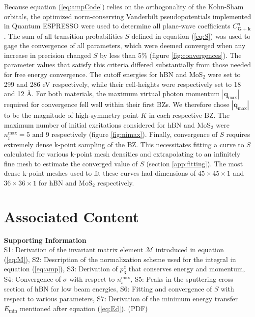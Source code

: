 \documentclass{article}
\begin{document}
Because equation (\ref{eq:ampCode}) relies on the orthogonality of the
Kohn-Sham orbitals, the optimized norm-conserving Vanderbilt
pseudopotentials \cite{Hamann2013, Schlipf2015} implemented in Quantum
ESPRESSO \cite{Giannozzi2009} were used to determine all plane-wave coefficients
$C^n_\mathbf{G+k}$.
The sum of all transition probabilities $S$ defined in equation (\ref{eq:S})
was used to gage the convergence of all parameters, which were deemed converged
when any increase in precision changed $S$ by less than 5\% (figure
\ref{fig:convergences}).
The parameter values that satisfy this criteria differed substantially from
those needed for free energy convergence.
The cutoff energies for hBN and MoS$_2$ were set to 299 and 286 eV
respectively, while their cell-heights were respectively set to 18 and 12
{\AA}.
For both materials, the maximum virtual photon momentum
$|\mathbf{q}_\text{max}|$ required for convergence fell well within their first
BZs.
We therefore chose $|\mathbf{q}_\text{max}|$ to be the magnitude of
high-symmetry point $K$ in each respective BZ.
The maximum number of initial excitations considered for hBN and MoS$_2$ were
$n_i^\text{max} = 5$ and 9 respectively (figure \ref{fig:nimax}).
Finally, convergence of $S$ requires extremely dense k-point sampling of the
BZ.
This necessitates fitting a curve to $S$ calculated for various k-point mesh
densities and extrapolating to an infinitely fine mesh to estimate the
converged value of $S$ (section \ref{app:fitting}).
The most dense k-point meshes used to fit these curves had dimensions of
$45\times45\times1$ and $36\times36\times1$ for hBN and MoS$_2$ respectively.

\section{Associated Content}
\label{sec:si}

\noindent
{\bf Supporting Information}\\
\noindent
S1: Derivation of the invariant matrix element $\mathcal{M}$ introduced in
equation (\ref{eq:M}),
S2: Description of the normalization scheme used for the integral in equation
(\ref{eq:amp}),
S3: Derivation of $p_3^z$ that conserves energy and momentum,
S4: Convergence of $\sigma$ with respect to $n_i^\text{max}$,
S5: Peaks in the sputtering cross section of hBN for low beam energies,
S6: Fitting and convergence of $S$ with respect to various parameters,
S7: Derivation of the minimum energy transfer $E_\text{min}$ mentioned after
equation (\ref{eq:Ed}).
(PDF)
\end{document}
